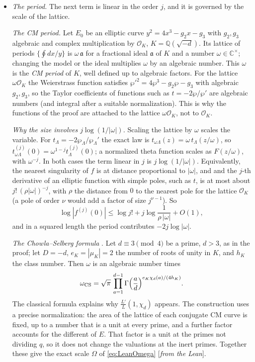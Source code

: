 \documentclass[11pt]{amsart}
\numberwithin{equation}{section}
\theoremstyle{definition}
\theoremstyle{remark}
\newcommand{\Q}{\mathbb Q}
\newcommand{\C}{\mathbb C}
\newcommand{\cO}{\mathcal O}
\newcommand{\status}[1]{\textup{[\emph{#1}]}}
\begin{document}
\begin{itemize}[leftmargin=2em]
\item \emph{The period.} The next term is linear in the order $j$, and it is governed by the scale of the lattice.

\emph{The CM period.} Let $E_0$ be an elliptic curve $y^2=4x^3-g_2x-g_3$ with $g_2,g_3$ algebraic and complex multiplication by $\cO_K$, $K=\Q(\sqrt{-d})$. Its lattice of periods $\{\oint dx/y\}$ is $\omega\,\mathfrak a$ for a fractional ideal $\mathfrak a$ of $K$ and a number $\omega\in\C^\times$; changing the model or the ideal multiplies $\omega$ by an algebraic number. This $\omega$ is the \emph{CM period} of $K$, well defined up to algebraic factors. For the lattice $\omega\cO_K$ the Weierstrass function satisfies $\wp'^2=4\wp^3-g_2\wp-g_3$ with algebraic $g_2,g_3$, so the Taylor coefficients of functions such as $t=-2\wp/\wp'$ are algebraic numbers (and integral after a suitable normalization). This is why the functions of the proof are attached to the lattice $\omega\cO_K$, not to $\cO_K$.

\emph{Why the size involves $j\log(1/|\omega|)$.} Scaling the lattice by $\omega$ scales the variable. For $t_\Lambda=-2\wp_\Lambda/\wp_\Lambda'$ the exact law is $t_{\omega\Lambda}(z)=\omega\,t_\Lambda(z/\omega)$, so $t_{\omega\Lambda}^{(j)}(0)=\omega^{1-j}t_\Lambda^{(j)}(0)$; a normalized theta function scales as $F(z/\omega)$, with $\omega^{-j}$. In both cases the term linear in $j$ is $j\log(1/|\omega|)$. Equivalently, the nearest singularity of $f$ is at distance proportional to $|\omega|$, and and the $j$-th derivative of an elliptic function with simple poles, such as $t$, is at most about $j!\,(\rho|\omega|)^{-j}$, with $\rho$ the distance from $0$ to the nearest pole for the lattice $\cO_K$ (a pole of order $\nu$ would add a factor of size $j^{\nu-1}$). So
\begin{equation}
 \log|f^{(j)}(0)|\le\log j!+j\log\frac1{\rho\,|\omega|}+O(1),
\end{equation}
and in a squared length the period contributes $-2j\log|\omega|$.

\emph{The Chowla--Selberg formula} \cite{CS}. Let $d\equiv3\pmod4$ be a prime, $d>3$, as in the proof; let $D=-d$, $e_K=|\mu_K|=2$ the number of roots of unity in $K$, and $h_K$ the class number. Then $\omega$ is an algebraic number times
\begin{equation}\label{eq:CS}
 \omega_{\mathrm{CS}}=\sqrt\pi\,\prod_{a=1}^{d-1}\Gamma\Bigl(\frac ad\Bigr)^{e_K\chi_d(a)/(4h_K)} .
\end{equation}
The classical formula explains why $\frac{L'}L(1,\chi_d)$ appears. The construction uses a precise normalization: the area of the lattice of each conjugate CM curve is fixed, up to a number that is a unit at every prime, and a further factor accounts for the different of $E$. That factor is a unit at the primes not dividing $q$, so it does not change the valuations at the inert primes. Together these give the exact scale $\Omega$ of \eqref{eq:LeanOmega} \status{from the Lean}.


\end{itemize}
\end{document}
